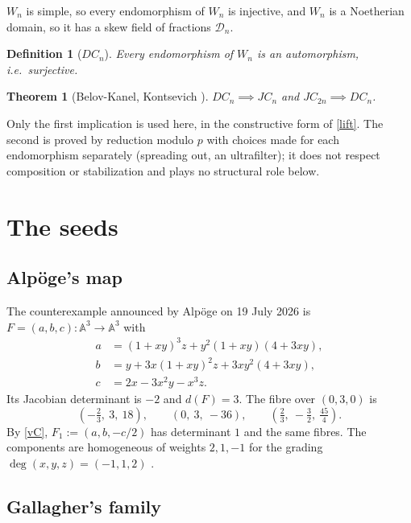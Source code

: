 \documentclass[11pt]{article}
\theoremstyle{change}
\newtheorem{definition}[equation]{Definition}
\newtheorem{theorem}[equation]{Theorem}
\theoremstyle{nonumberplain}
\renewcommand\AA{{\mathbb A}}
\newcommand\cD{{\mathcal D}}
\begin{document}
$W_n$ is simple, so every endomorphism of $W_n$ is injective, and $W_n$ is a Noetherian domain, so it has a skew field of fractions $\cD_n$.

\begin{definition}[$DC_n$]
Every endomorphism of $W_n$ is an automorphism, i.e.\ surjective.
\end{definition}

\begin{theorem}[Belov-Kanel, Kontsevich \cite{BKK}]
$DC_n \implies JC_n$ and $JC_{2n} \implies DC_n$.
\end{theorem}

Only the first implication is used here, in the constructive form of \cref{lift}. The second is proved by reduction modulo $p$ with choices made for each endomorphism separately (spreading out, an ultrafilter); it does not respect composition or stabilization and plays no structural role below.

\section{The seeds\label{seed}}

\subsection{Alp\"oge's map}

The counterexample announced by Alp\"oge on 19 July 2026 \cite{Alpoge,Speyer} is $F = (a,b,c): \AA^3 \to \AA^3$ with
\begin{align*}
a&=(1+xy)^3z+y^2(1+xy)(4+3xy),\\
b&=y+3x(1+xy)^2z+3xy^2(4+3xy),\\
c&=2x-3x^2y-x^3z.
\end{align*}
Its Jacobian determinant is $-2$ and $d(F) = 3$. The fibre over $(0,3,0)$ is
\begin{equation*}
\left( -\tfrac{2}{3},\ 3,\ 18 \right), \qquad \left( 0,\ 3,\ -36 \right), \qquad \left( \tfrac{2}{3},\ -\tfrac{3}{2},\ \tfrac{45}{4} \right).
\end{equation*}
By \cref{vC}, $F_1 := (a, b, -c/2)$ has determinant $1$ and the same fibres. The components are homogeneous of weights $2, 1, -1$ for the grading $\deg(x,y,z) = (-1,1,2)$ \cite{Speyer}.

\subsection{Gallagher's family}
\end{document}
